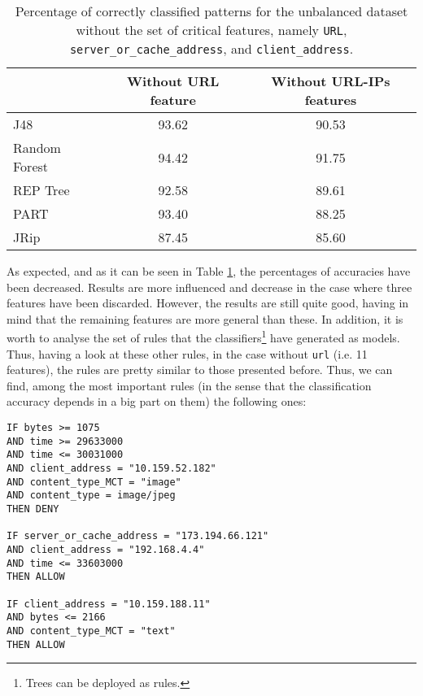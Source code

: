 \documentclass{llncs}
\begin{document}
\begin{table}[htpb]
\centering
 \caption{\label{tab_rules_study_classification} Percentage of correctly classified patterns for the unbalanced dataset without the set of critical features, namely \texttt{URL}, \texttt{server\_or\_cache\_address}, and \texttt{client\_address}.}
{\small
\begin{tabular}{|l|c|c|}
\cline{2-3}
\multicolumn{1}{l|}{} & Without URL feature & Without URL-IPs features\\
\hline
J48 & 93.62 & 90.53 \\
\cline{1-1}
Random Forest & 94.42 & 91.75 \\
\cline{1-1}
REP Tree & 92.58 & 89.61 \\
\cline{1-1}
PART & 93.40 & 88.25 \\
\cline{1-1}
JRip & 87.45 & 85.60 \\
\hline
\end{tabular}
}
\end{table}

As expected, and as it can be seen in Table \ref{tab_rules_study_classification}, the percentages of accuracies have been decreased. Results are more influenced and decrease  in the case where three features have been discarded. However, the results are still quite good, having in mind that the remaining features are more general than these. In addition, it is worth to analyse the set of rules that the classifiers\footnote{Trees can be deployed as rules.} have generated as models. Thus, having a look at these other rules, in the case without \texttt{url} (i.e. 11 features), the rules are pretty similar to those presented before. Thus, we can find, among the most important rules (in the sense that the classification accuracy depends in a big part on them) the following ones:

\begin{small}
\begin{verbatim}
IF bytes >= 1075
AND time >= 29633000
AND time <= 30031000
AND client_address = "10.159.52.182"
AND content_type_MCT = "image"
AND content_type = image/jpeg
THEN DENY

IF server_or_cache_address = "173.194.66.121"
AND client_address = "192.168.4.4"
AND time <= 33603000
THEN ALLOW

IF client_address = "10.159.188.11"
AND bytes <= 2166
AND content_type_MCT = "text"
THEN ALLOW
\end{verbatim}
\end{small}
\end{document}
